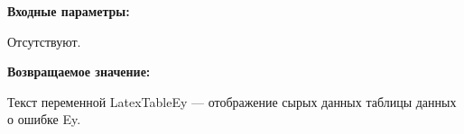\textbf{Входные параметры:}

Отсутствуют.

\textbf{Возвращаемое значение:}

Текст переменной LatexTableEy --- отображение сырых данных таблицы данных о ошибке Ey.
